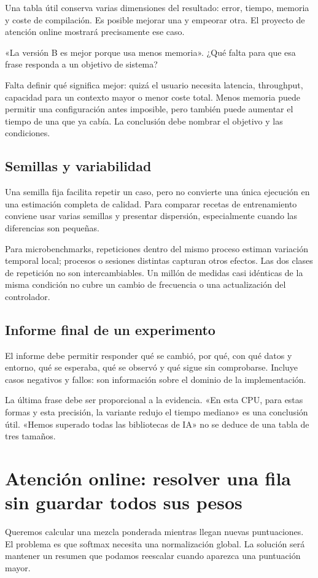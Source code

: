 \documentclass[12pt,a4paper,oneside]{report}
\begin{document}
Una tabla útil conserva varias dimensiones del resultado: error, tiempo, memoria y coste de compilación. Es posible mejorar una y empeorar otra. El proyecto de atención online mostrará precisamente ese caso.

\begin{practica}
«La versión B es mejor porque usa menos memoria». ¿Qué falta para que esa frase responda a un objetivo de sistema?

\end{practica}
Falta definir qué significa mejor: quizá el usuario necesita latencia, throughput, capacidad para un contexto mayor o menor coste total. Menos memoria puede permitir una configuración antes imposible, pero también puede aumentar el tiempo de una que ya cabía. La conclusión debe nombrar el objetivo y las condiciones.

\section{Semillas y variabilidad}
Una semilla fija facilita repetir un caso, pero no convierte una única ejecución en una estimación completa de calidad. Para comparar recetas de entrenamiento conviene usar varias semillas y presentar dispersión, especialmente cuando las diferencias son pequeñas.

Para microbenchmarks, repeticiones dentro del mismo proceso estiman variación temporal local; procesos o sesiones distintas capturan otros efectos. Las dos clases de repetición no son intercambiables. Un millón de medidas casi idénticas de la misma condición no cubre un cambio de frecuencia o una actualización del controlador.

\section{Informe final de un experimento}
El informe debe permitir responder qué se cambió, por qué, con qué datos y entorno, qué se esperaba, qué se observó y qué sigue sin comprobarse. Incluye casos negativos y fallos: son información sobre el dominio de la implementación.

La última frase debe ser proporcional a la evidencia. «En esta CPU, para estas formas y esta precisión, la variante redujo el tiempo mediano» es una conclusión útil. «Hemos superado todas las bibliotecas de IA» no se deduce de una tabla de tres tamaños.


\chapter{Atención online: resolver una fila sin guardar todos sus pesos}
\label{ch:online}
\begin{idea}
Queremos calcular una mezcla ponderada mientras llegan nuevas puntuaciones. El problema es que softmax necesita una normalización global. La solución será mantener un resumen que podamos reescalar cuando aparezca una puntuación mayor.

\end{idea}
\end{document}
